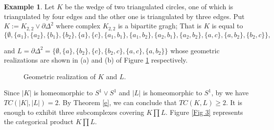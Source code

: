 \documentclass[preprint,11pt %
]{hjm1}
\theoremstyle{definition}
\newtheorem{example}[theorem]{Example}
\begin{document}
\begin{example}\label{exa}
Let $K$ be the wedge of two triangulated circles, one of which is triangulated by four edges and the other one is triangulated by three edges. Put $K:=K_{2,2}\vee \partial \Delta ^{2}$ where complex $K_{2,2}$ is a bipartite gragh; That is $K$ is equal to
\[
\lbrace \emptyset ,\lbrace a_1\rbrace ,\lbrace a_2 \rbrace ,\lbrace b_1\rbrace ,\lbrace b_2\rbrace ,\lbrace a\rbrace ,\lbrace c\rbrace ,\lbrace a_1,b_1\rbrace ,\lbrace a_1,b_2\rbrace ,\lbrace a_2,b_1\rbrace ,\lbrace a_2,b_2\rbrace ,\lbrace a,c\rbrace ,\lbrace a,b_2\rbrace ,\lbrace b_2,c\rbrace \rbrace ,
\]

\noindent
and $L=\partial \Delta ^{2} =\lbrace \emptyset ,\lbrace a\rbrace ,\lbrace b_2 \rbrace ,\lbrace c\rbrace ,\lbrace b_2,c\rbrace ,\lbrace a,c\rbrace ,\lbrace a,b_2\rbrace\rbrace$ whose geometric realizations are shown in (a) and (b) of Figure \ref{Fig1} respectively.

\begin{figure}[!ht]
\centering
\parbox{6cm}{
}
%
\parbox{2.5cm}{
}
\caption{Geometric realization of $K$ and $L$.}\label{Fig1}
\end{figure}




Since $|K|$ is homeomorphic to $S^1 \vee S^1$ and $|L|$ is homeomorphic to  $S^1$, by \cite[Proposition 3.13]{rel} we have $TC(|K|,|L|)=2$. By Theorem \ref{e}, we can conclude that $TC(K,L)\geq 2$. It is enough to exhibit three subcomplexes covering $K \prod L$. Figure \ref{Fig 3} represents the categorical product $K \prod L$.



\end{example}
\end{document}
